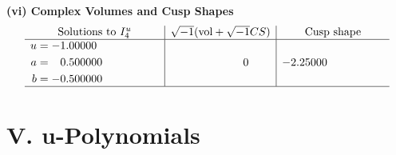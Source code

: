 \documentclass[1p]{elsarticle_modified}
\theoremstyle{definition}
\newcommand{\I}{\sqrt{-1}}
\begin{document}
\newpage\flushleft \textbf{(vi) Complex Volumes and Cusp Shapes}
$$\begin{array}{c|c|c}  
\text{Solutions to }I^u_{4}& \I (\text{vol} + \sqrt{-1}CS) & \text{Cusp shape}\\
 \hline 
\begin{aligned}
u &= -1.00000\phantom{ +0.000000I} \\
a &= \phantom{-}0.500000\phantom{ +0.000000I} \\
b &= -0.500000\phantom{ +0.000000I}\end{aligned}
 & \phantom{-0.000000 } 0 & -2.25000\phantom{ +0.000000I}\\
 \hline 
 \end{array}$$\newpage
\newpage\renewcommand{\arraystretch}{1}
\centering \section*{ V. u-Polynomials}
\end{document}
